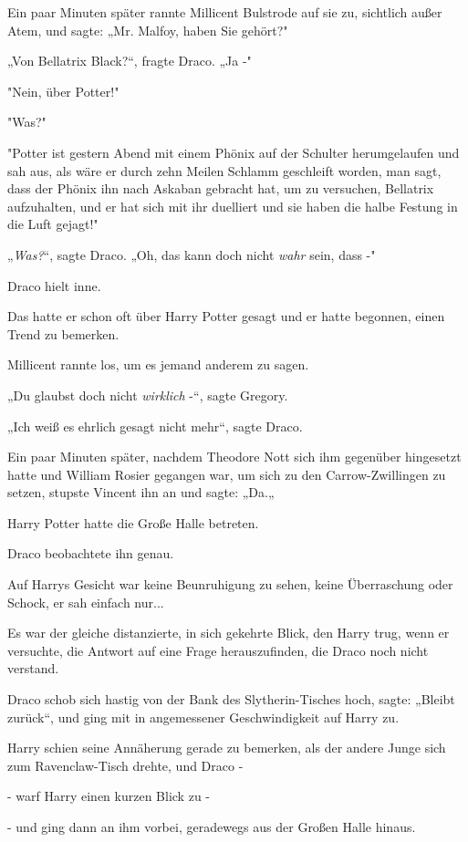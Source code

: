 {Ein paar Minuten später rannte Millicent Bulstrode auf sie zu, sichtlich außer Atem, und sagte: „Mr. Malfoy, haben Sie gehört?"

„Von Bellatrix Black?“, fragte Draco. „Ja -"

"Nein, über Potter!"

"Was?"

"Potter ist gestern Abend mit einem Phönix auf der Schulter herumgelaufen und sah aus, als wäre er durch zehn Meilen Schlamm geschleift worden, man sagt, dass der Phönix ihn nach Askaban gebracht hat, um zu versuchen, Bellatrix aufzuhalten, und er hat sich mit ihr duelliert und sie haben die halbe Festung in die Luft gejagt!"

„\emph{Was?}“, sagte Draco. „Oh, das kann doch nicht \emph{wahr} sein, dass -"

Draco hielt inne.

Das hatte er schon oft über Harry Potter gesagt und er hatte begonnen, einen Trend zu bemerken.

Millicent rannte los, um es jemand anderem zu sagen.

„Du glaubst doch nicht \emph{wirklich} -“, sagte Gregory.

„Ich weiß es ehrlich gesagt nicht mehr“, sagte Draco.

Ein paar Minuten später, nachdem Theodore Nott sich ihm gegenüber hingesetzt hatte und William Rosier gegangen war, um sich zu den Carrow-Zwillingen zu setzen, stupste Vincent ihn an und sagte: „Da.„

Harry Potter hatte die Große Halle betreten.

Draco beobachtete ihn genau.

Auf Harrys Gesicht war keine Beunruhigung zu sehen, keine Überraschung oder Schock, er sah einfach nur...

Es war der gleiche distanzierte, in sich gekehrte Blick, den Harry trug, wenn er versuchte, die Antwort auf eine Frage herauszufinden, die Draco noch nicht verstand.

Draco schob sich hastig von der Bank des Slytherin-Tisches hoch, sagte: „Bleibt zurück“, und ging mit in angemessener Geschwindigkeit auf Harry zu.

Harry schien seine Annäherung gerade zu bemerken, als der andere Junge sich zum Ravenclaw-Tisch drehte, und Draco -

- warf Harry einen kurzen Blick zu -

- und ging dann an ihm vorbei, geradewegs aus der Großen Halle hinaus.

}

